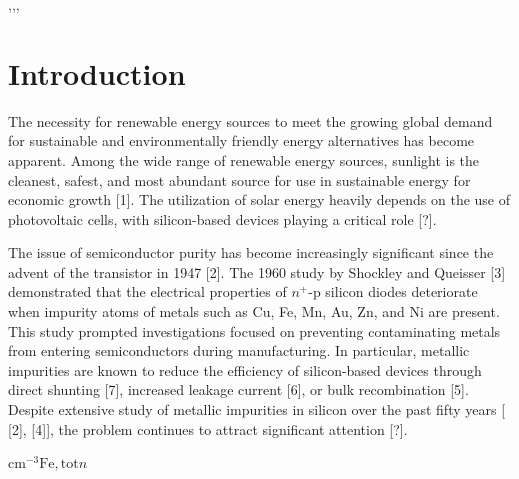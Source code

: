 \documentclass[a4paper,fleqn]{cas-sc}
\begin{document}
\begin{keywords}
 \sep \sep \sep
\end{keywords}

\maketitle

\section{Introduction}\label{}
\par
The necessity for renewable energy sources to meet the growing global demand for sustainable and environmentally friendly energy alternatives has become apparent. Among the wide range of renewable energy sources, sunlight is the cleanest, safest, and most abundant source for use in sustainable energy for economic growth \cite{PratapSingh2019} [1]. The utilization of solar energy heavily depends on the use of photovoltaic cells, with silicon-based devices playing a critical role [?].


The issue of semiconductor purity has become increasingly significant since the advent of the transistor in 1947 \cite{Claers2018} [2]. The 1960 study by Shockley and Queisser \cite{Goetzberger1960} [3] demonstrated that the electrical properties of $n^{+}$-p silicon diodes deteriorate when impurity atoms of metals such as Cu, Fe, Mn, Au, Zn, and Ni are present. This study prompted investigations focused on preventing contaminating metals from entering semiconductors during manufacturing. In particular, metallic impurities are known to reduce the efficiency of silicon-based devices through direct shunting \cite{Breitenstein2004} [7], increased leakage current \cite{Lee1980} [6], or bulk recombination \cite{Istratov2000} [5]. Despite extensive study of metallic impurities in silicon over the past fifty years [\cite{Claers2018} [2], \cite{Pearce1977} [4]], the problem continues to attract significant attention [?].

cm$^{-3}\mathrm{Fe,tot}n$
\end{document}
